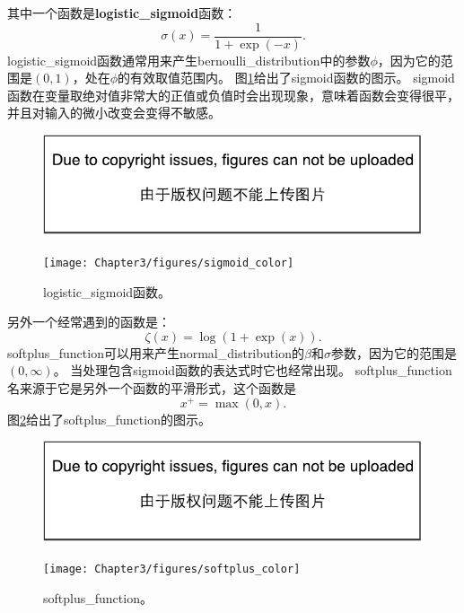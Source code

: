 其中一个函数是\textbf{\gls{logistic_sigmoid}}函数：
\begin{equation}
\sigma(x) = \frac{1}{1+\exp(-x)}.
\end{equation}
\gls{logistic_sigmoid}函数通常用来产生\gls{bernoulli_distribution}中的参数$\phi$，因为它的范围是$(0,1)$，处在$\phi$的有效取值范围内。
图\ref{fig:chap3_sigmoid_color}给出了sigmoid函数的图示。
sigmoid函数在变量取绝对值非常大的正值或负值时会出现现象，意味着函数会变得很平，并且对输入的微小改变会变得不敏感。
\begin{figure}[!htb]
\ifOpenSource
\centerline{\includegraphics{figure.pdf}}
\else
\centerline{\texttt{[image: Chapter3/figures/sigmoid\_color]}}
\fi
\caption{\gls{logistic_sigmoid}函数。}
\label{fig:chap3_sigmoid_color}
\end{figure}

另外一个经常遇到的函数是\citep{secondorder:2001:nips}：
\begin{equation}
\zeta(x) = \log(1+\exp(x)).
\end{equation}
\gls{softplus_function}可以用来产生\gls{normal_distribution}的$\beta$和$\sigma$参数，因为它的范围是$(0,\infty)$。
当处理包含sigmoid函数的表达式时它也经常出现。
\gls{softplus_function}名来源于它是另外一个函数的平滑形式，这个函数是
\begin{equation}
x^+ = \max(0, x).
\end{equation}
图\ref{fig:chap3_softplus_color}给出了\gls{softplus_function}的图示。
\begin{figure}[!htb]
\ifOpenSource
\centerline{\includegraphics{figure.pdf}}
\else
\centerline{\texttt{[image: Chapter3/figures/softplus\_color]}}
\fi
\caption{\gls{softplus_function}。}
\label{fig:chap3_softplus_color}
\end{figure}


